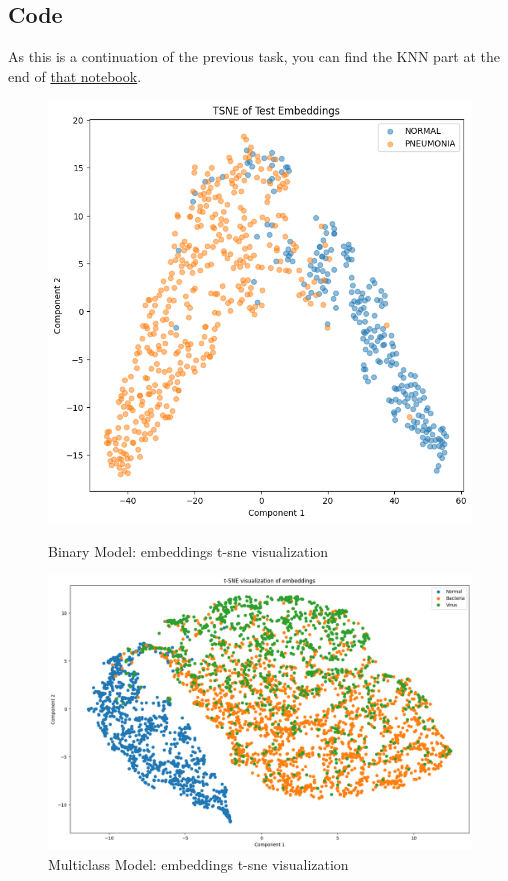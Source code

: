 \documentclass{article}
\begin{document}
\subsection{Code}

As this is a continuation of the previous task, you can find the KNN part at the end of \href{https://colab.research.google.com/drive/1Tn58ilSmOiaNIyFNw5BHlqye3YQIMplX#scrollTo=WdLwzqsl1jHO}{that notebook}.


\begin{figure}[ht]
  \centering
  \begin{minipage}{0.35\linewidth}
    \includegraphics[width=\linewidth]{binary_tsne.png}
    \caption{Binary Model: embeddings t-sne visualization}
    \label{fig:binary_tsne}
  \end{minipage}
  \begin{minipage}{0.55\linewidth}
    \includegraphics[width=\linewidth]{t_sne_1b.png}
    \caption{Multiclass Model: embeddings t-sne visualization}
    \label{fig:t_sne_1b}
  \end{minipage}
\end{figure}
\end{document}
